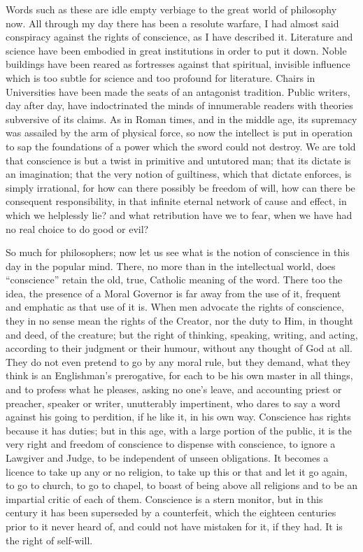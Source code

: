 Words such as these are idle empty verbiage to the great world of
philosophy now. All through my day there has been a resolute warfare, I
had almost said conspiracy against the rights of conscience, as I have
described it. Literature and science have been embodied in great
institutions in order to put it down. Noble buildings have been reared
as fortresses against that spiritual, invisible influence which is too
subtle for science and too profound for literature. Chairs in
Universities have been made the seats of an antagonist tradition. Public
writers, day after day, have indoctrinated the minds of innumerable
readers with theories subversive of its claims. As in Roman times, and
in the middle age, its supremacy was assailed by the arm of physical
force, so now the intellect is put in operation to sap the foundations
of a power which the sword could not destroy. We are told that
conscience is but a twist in primitive and untutored man; that its
dictate is an imagination; that the very notion of guiltiness, which
that dictate enforces, is simply irrational, for how can there possibly
be freedom of will, how can there be consequent responsibility, in that
infinite eternal network of cause and effect, in which we helplessly
lie? and what retribution have we to fear, when we have had no real
choice to do good or evil?

So much for philosophers; now let us see what is the notion of
conscience in this day in the popular mind. There, no more than in
the intellectual world, does ``conscience'' retain the old,
true, Catholic meaning of the word. There too the idea, the presence of
a Moral Governor is far away from the use of it, frequent and emphatic
as that use of it is. When men advocate the rights of conscience, they
in no sense mean the rights of the Creator, nor the duty to Him, in
thought and deed, of the creature; but the right of thinking, speaking,
writing, and acting, according to their judgment or their humour,
without any thought of God at all. They do not even pretend to go by any
moral rule, but they demand, what they think is an Englishman's
prerogative, for each to be his own master in all things, and to profess
what he pleases, asking no one's leave, and accounting priest or
preacher, speaker or writer, unutterably impertinent, who dares to say a
word against his going to perdition, if he like it, in his own way.
Conscience has rights because it has duties; but in this age, with a
large portion of the public, it is the very right and freedom of
conscience to dispense with conscience, to ignore a Lawgiver and Judge,
to be independent of unseen obligations. It becomes a licence to take up
any or no religion, to take up this or that and let it go again, to go
to church, to go to chapel, to boast of being above all religions and to
be an impartial critic of each of them. Conscience is a stern monitor,
but in this century it has been superseded by a counterfeit, which the
eighteen centuries prior to it never heard of, and could not have
mistaken for it, if they had. It is the right of self-will.


